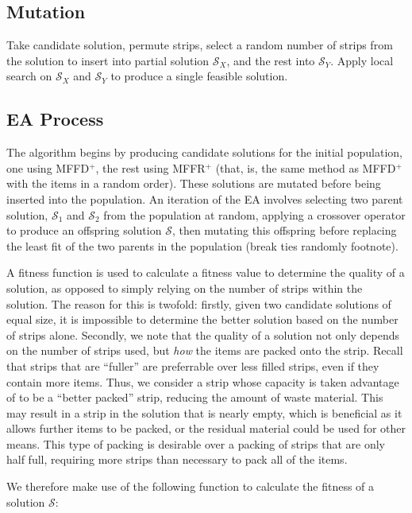 \documentclass{elsarticle}
\begin{document}
\subsection{Mutation}
\label{sub:mutation}
Take candidate solution, permute strips, select a random number of strips from the solution to insert into partial solution $\mathcal{S}_X$, and the rest into $\mathcal{S}_Y$. Apply local search on $\mathcal{S}_X$ and $\mathcal{S}_Y$ to produce a single feasible solution.

\subsection{EA Process}
\label{sub:eaframework}
The algorithm begins by producing candidate solutions for the initial population, one using MFFD$^+$, the rest using MFFR$^+$ (that, is, the same method as MFFD$^+$ with the items in a random order). These solutions are mutated before being inserted into the population. An iteration of the EA involves selecting two parent solution, $\mathcal{S}_1$ and $\mathcal{S}_2$ from the population at random, applying a crossover operator to produce an offspring solution $\mathcal{S}$, then mutating this offspring before replacing the least fit of the two parents in the population (break ties randomly footnote). 

A fitness function is used to calculate a fitness value to determine the quality of a solution, as opposed to simply relying on the number of strips within the solution. The reason for this is twofold: firstly, given two candidate solutions of equal size, it is impossible to determine the better solution based on the number of strips alone. Secondly, we note that the quality of a solution not only depends on the number of strips used, but \emph{how} the items are packed onto the strip. Recall that strips that are ``fuller'' are preferrable over less filled strips, even if they contain more items. Thus, we consider a strip whose capacity is taken advantage of to be a ``better packed'' strip, reducing the amount of waste material. This may result in a strip in the solution that is nearly empty, which is beneficial as it allows further items to be packed, or the residual material could be used for other means. This type of packing is desirable over a packing of strips that are only half full, requiring more strips than necessary to pack all of the items. 

We therefore make use of the following function to calculate the fitness of a solution $\mathcal{S}$:
\end{document}
